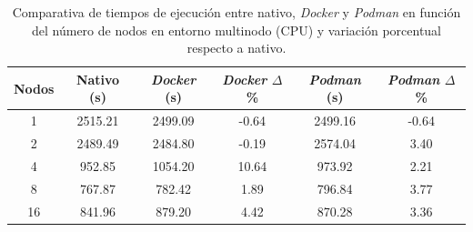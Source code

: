 \begin{table}[ht]
    \centering
    \small
    \setlength{\tabcolsep}{4pt}
    \renewcommand{\arraystretch}{1.1}
    \begin{tabular}{|c|c|c|c|c|c|}
        \hline
        \textbf{Nodos} & \textbf{Nativo (s)} & \textbf{\textit{Docker} (s)} & \textbf{\textit{Docker} $\Delta$\%} & \textbf{\textit{Podman} (s)} & \textbf{\textit{Podman} $\Delta$\%} \\
        \hline
        1              & 2515.21             & 2499.09                      & -0.64                               & 2499.16                      & -0.64                               \\
        2              & 2489.49             & 2484.80                      & -0.19                               & 2574.04                      & 3.40                                \\
        4              & 952.85              & 1054.20                      & 10.64                               & 973.92                       & 2.21                                \\
        8              & 767.87              & 782.42                       & 1.89                                & 796.84                       & 3.77                                \\
        16             & 841.96              & 879.20                       & 4.42                                & 870.28                       & 3.36                                \\
        \hline
    \end{tabular}
    \caption{Comparativa de tiempos de ejecución entre nativo, \textit{Docker} y \textit{Podman} en función del número de nodos en entorno multinodo (CPU) y variación porcentual respecto a nativo.}
    \label{tab:multi-node_ubuntu_container_vs_native}
\end{table}

